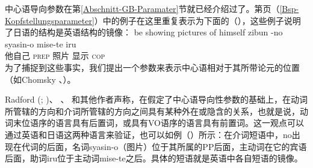 \mbox{}%
中心语导向参数在第\ref{Abschnitt-GB-Paramater}节就已经介绍过了。第\pageref{Bsp-Kopfstellungsparameter}页（\ref{Bsp-Kopfstellungsparameter}）中的例子在这里重复表示为下面的（），这些例子说明了日语的结构是英语结构的镜像：
\eal
\label{Bsp-Kopfstellungsparameter-zwei}
\ex 
be showing pictures of himself
\ex
\gll zibun  -no syasin-o mise-te iru\\
     他自己 \textsc{prep} 照片 显示 \textsc{cop}\\
\zl
为了捕捉到这些事实，我们提出一个参数来表示中心语相对于其所带论元的位置（如Chomsky \citeyear[]{Chomsky86}、\citeyear[]{Chomsky88a-u}）。

Radford (\citeyear[--61]{Radford90a-u}; \citeyear[--22]{Radford97a-u})、 \citet[, 238]{Pinker94a}、 \citet[]{Baker2003b}和其他作者声称，在假定了中心语导向性参数的基础上，在动词所管辖的方向和介词所管辖的方向之间具有某种外在或隐含的关系，也就是说，动词末位语序的语言具有后置词，或具有VO语序的语言具有前置词。这一观点可以通过英语和日语这两种语言来验证，也可以如例（）所示：在介词短语中，no出现在代词的后面，名词syasin-o（图片）位于其所属的PP后面，主动词在它的宾语后面，助词iru位于主动词mise-te之后。具体的短语就是英语中各自短语的镜像。


